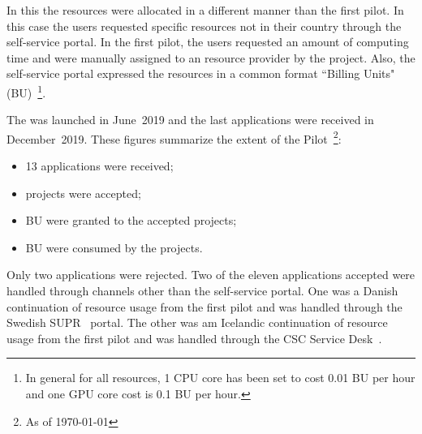 
In this \pilot the resources were allocated in a different manner than the first pilot.
In this case the users requested specific resources not in their country through the self-service portal. 
In the first \dell pilot, the users requested an amount of computing time and were manually assigned to an \einfra resource
provider by the \dell project.
Also, the self-service portal expressed the \einfra resources in a common format
``Billing Units" (BU)~\footnote{In general for all \dell resources, 1 CPU
core has been set to cost 0.01 BU per hour and one GPU core cost is 0.1 BU per hour.}.

The \dell \pilot was launched in June~2019 and the last applications were received in December~2019. 
These figures summarize the extent of the Pilot~\footnote{As of \today}:
\begin{itemize}
\item 13 applications were received;
\item \accepted projects were accepted;
\item \BUalloc BU were granted to the accepted projects;
\item \BUcons BU were consumed by the projects.
\end{itemize}
Only two applications were rejected. 
Two of the eleven applications accepted were handled through channels other than the self-service portal.
One was a Danish continuation of resource usage from the first \dell pilot and was handled through the Swedish SUPR~\cite{supr} portal.
The other was am Icelandic continuation of resource usage from the first \dell pilot and was handled through the CSC Service Desk~\cite{csc-service-desk}.

